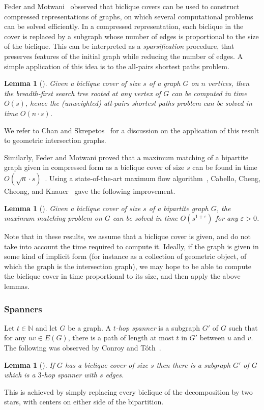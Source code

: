 \documentclass{amsart}
\newtheorem{lemma}[theorem]{Lemma}
\newcommand{\darkblue}{\color{darkblue}} %
\newcommand{\defn}[1]{\textsl{\darkblue #1}} %
\begin{document}
Feder and Motwani~\cite{FM95} observed that biclique covers can be used to construct compressed representations of graphs, on which several computational problems can be solved efficiently. 
In a compressed representation, each biclique in the cover is replaced by a subgraph whose number of edges is proportional to the size of the biclique. This can be interpreted as a \emph{sparsification} procedure, that preserves features of the initial graph while reducing the number of edges.
A simple application of this idea is to the all-pairs shortest paths problem. 
\begin{lemma}[\cite{FM95}]
\label{lem:apsp}
Given a biclique cover of size $s$ of a graph $G$ on $n$ vertices, then the breadth-first search tree rooted at any vertex of $G$ can be computed in time $O(s)$, hence the (unweighted) all-pairs shortest paths problem can be solved in time $O(n\cdot s)$.
\end{lemma}
We refer to Chan and Skrepetos~\cite{CS19} for a discussion on the application of this result to geometric intersection graphs.
 
Similarly, Feder and Motwani proved that a maximum matching of a bipartite graph given in compressed form as a biclique cover of size $s$ can be found in time $O(\sqrt{n}\cdot s)$~\cite[Theorem 4.2]{FM95}. 
Using a state-of-the-art maximum flow algorithm~\cite{CKLPGS22,BCPKLGSS23}, Cabello, Cheng, Cheong, and Knauer~\cite{CCCK24} gave the following improvement.

\begin{lemma}[\cite{CCCK24}]
\label{lem:matching}
Given a biclique cover of size $s$ of a bipartite graph $G$, the maximum matching problem on $G$ can be solved in time $O(s^{1+\varepsilon})$ for any $\varepsilon > 0$.   
\end{lemma}

Note that in these results, we assume that a biclique cover is given, and do not take into account the time required to compute it. Ideally, if the graph is given in some kind of implicit form (for instance as a collection of geometric object, of which the graph is the intersection graph), we may hope to be able to compute the biclique cover in time proportional to its size, and then apply the above lemmas.

\subsubsection{Spanners}

Let $t\in \mathbb{N}$ and let $G$ be a graph. A \defn{$t$-hop spanner} is a subgraph $G'$ of $G$ such that for any $uv\in E(G)$, there is a path of length at most $t$ in $G'$ between $u$ and $v$. 
The following was observed by Conroy and T{\'{o}}th~\cite{CT22}. 
\begin{lemma}[\cite{CT22}]
\label{lem:spanner}
If $G$ has a biclique cover of size $s$ then there is a subgraph $G'$ of $G$ which is a $3$-hop spanner with $s$ edges. 
\end{lemma}
This is achieved by simply replacing every biclique of the decomposition by two stars, with centers on either side of the bipartition.
\end{document}
